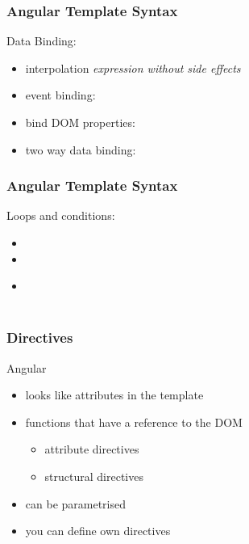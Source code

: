 \begin{frame}[fragile] \frametitle{Angular Template Syntax}
Data Binding:
\begin{itemize}
  \item interpolation  \emph{expression without side effects} 
  \item event binding: 
  \item bind DOM properties: 
  \item two way data binding: 
\end{itemize}
\end{frame}

\begin{frame}[fragile] \frametitle{Angular Template Syntax}
Loops and conditions:
\begin{itemize}
  \item {}
  \item {}
  \item {}\\
   \hspace{3mm} \\
   \hspace{3mm} 
\end{itemize}
\end{frame}

\begin{frame}[fragile] \frametitle{Directives}
Angular
\begin{itemize}
  \item looks like attributes in the template
  \item functions that have a reference to the DOM
  \begin{itemize}
    \item attribute directives
    \item structural directives
  \end{itemize}
  \item can be parametrised
  \item you can define own directives
\end{itemize}
\end{frame}

